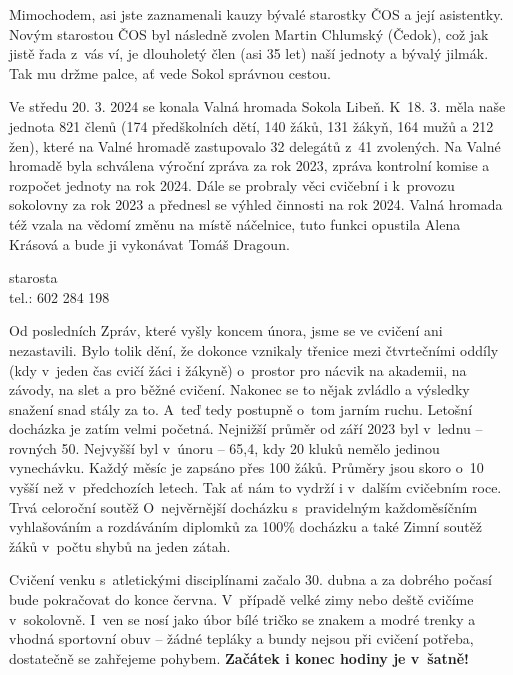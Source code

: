 \documentclass[11pt]{article}
\begin{document}
Mimochodem, asi jste zaznamenali kauzy bývalé starostky ČOS a její asistentky. Novým starostou ČOS byl následně zvolen Martin Chlumský (Čedok), což jak jistě řada z~vás ví, je dlouholetý člen (asi 35 let) naší jednoty a bývalý jilmák. Tak mu držme palce, ať vede Sokol správnou cestou.

Ve středu 20. 3. 2024 se konala Valná hromada Sokola Libeň. K~18. 3. měla naše jednota 821 členů (174 předškolních dětí, 140 žáků, 131 žákyň, 164 mužů a 212 žen), které na Valné hromadě zastupovalo 32 delegátů z~41 zvolených. Na Valné hromadě byla schválena výroční zpráva za rok 2023, zpráva kontrolní komise a rozpočet jednoty na rok 2024. Dále se probraly věci cvičební i k~provozu sokolovny za rok 2023 a přednesl se výhled činnosti na rok 2024. Valná hromada též vzala na vědomí změnu na místě náčelnice, tuto funkci opustila Alena Krásová a bude ji vykonávat Tomáš Dragoun.

\signature{Jiří Novák (Jirkan)}{starosta\\tel.: 602 284 198}

\vspace*{24pt}

Od posledních Zpráv, které vyšly koncem února, jsme se ve cvičení ani nezastavili. Bylo tolik dění, že dokonce vznikaly třenice mezi čtvrtečními oddíly (kdy v~jeden čas cvičí žáci i žákyně) o~prostor pro nácvik na akademii, na závody, na slet a pro běžné cvičení. Nakonec se to nějak zvládlo a výsledky snažení snad stály za to. A~teď tedy postupně o~tom jarním ruchu. Letošní docházka je zatím velmi početná. Nejnižší průměr od září 2023 byl v~lednu – rovných 50. Nejvyšší byl v~únoru – 65,4, kdy 20 kluků nemělo jedinou vynechávku. Každý měsíc je zapsáno přes 100 žáků. Průměry jsou skoro o~10 vyšší než v~předchozích letech. Tak ať nám to vydrží i v~dalším cvičebním roce. Trvá celoroční soutěž O~nejvěrnější docházku s~pravidelným každoměsíčním vyhlašováním a rozdáváním diplomků za 100\% docházku a také Zimní soutěž žáků v~počtu shybů na jeden zátah.

Cvičení venku s~atletickými disciplínami začalo 30. dubna a za dobrého počasí bude pokračovat do konce června. V~případě velké zimy nebo deště cvičíme v~sokolovně. I~ven se nosí jako úbor bílé tričko se znakem a modré trenky a vhodná sportovní obuv – žádné tepláky a bundy nejsou při cvičení potřeba, dostatečně se zahřejeme pohybem. \textbf{Začátek i konec hodiny je v~šatně!}  
\end{document}
